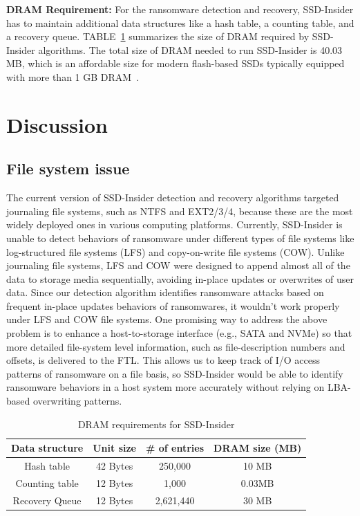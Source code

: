 \documentclass[conference]{IEEEtran}
\newcommand{\ours}{SSD-Insider}
\begin{document}
{\noindent\bf DRAM Requirement:}
For the ransomware detection and recovery, \ours{} has to maintain additional
data structures like a hash table, a counting table, and a recovery queue.
TABLE~\ref{tab:size_summary} summarizes the size of DRAM required by \ours{}
algorithms. The total size of DRAM needed to run \ours{} is 40.03 MB, which is
an affordable size for modern flash-based SSDs typically equipped with more
than 1 GB DRAM~\cite{hitachi-ssd, samsung-ssd, phison-ssd}.



\section{Discussion}
\subsection{File system issue} 
The current version of \ours{} detection and recovery
algorithms targeted journaling file systems, such as NTFS and
EXT2/3/4, because these are the most widely deployed ones in
various computing platforms. Currently, \ours{} is unable
to detect behaviors of ransomware under different types of file
systems like log-structured file systems (LFS) and copy-on-write
file systems (COW).  Unlike journaling file systems, LFS and COW
were designed to append almost all of the data to storage media
sequentially, avoiding in-place updates or overwrites of user data.
Since our detection algorithm identifies ransomware attacks based
on frequent in-place updates behaviors of ransomwares, it wouldn't
work properly under LFS and COW file systems. One promising way to
address the above problem is to enhance a host-to-storage interface
(e.g., SATA and NVMe) so that more detailed file-system level
information, such as file-description numbers and offsets, is
delivered to the FTL.  This allows us to keep track of I/O access
patterns of ransomware on a file basis, so \ours{} would be
able to identify ransomware behaviors in a host system more
accurately without relying on LBA-based overwriting patterns.

\begin{table}[t]
	\centering
	\caption{DRAM requirements for \ours{}}
	\begin{tabular}{c|c|c|c}
		\hline
		Data structure   	& Unit size & \# of entries & DRAM size (MB) \\
		\hline
		\hline
		Hash table 		&   42 Bytes & 250,000 & 10 MB \\ 
		Counting table		& 12 Bytes & 1,000 & 0.03MB \\ 
		Recovery Queue		& 12 Bytes &   2,621,440 &  30 MB \\ 
		\hline
	\end{tabular}
	\label{tab:size_summary}
\end{table}
\end{document}
